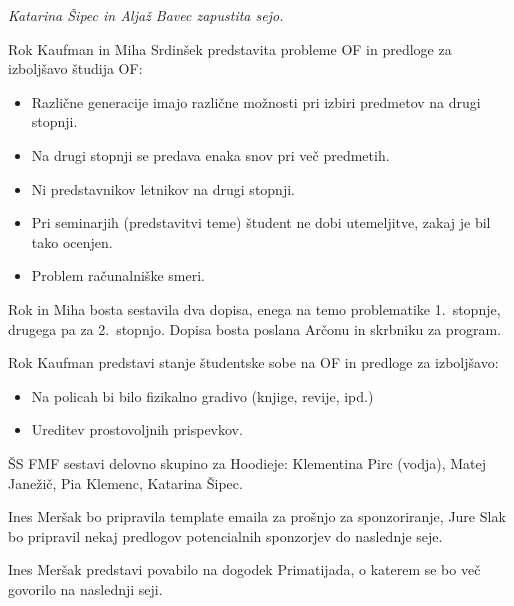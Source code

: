 \documentclass{seja}
\begin{document}
\begin{ad}
    \textit{Katarina Šipec in Aljaž Bavec zapustita sejo.}
    \item
    Rok Kaufman in Miha Srdinšek predstavita probleme OF in predloge za izboljšavo študija OF:
    \begin{itemize}
        \item
        Različne generacije imajo različne možnosti pri izbiri predmetov na drugi stopnji.
        \item
        Na drugi stopnji se predava enaka snov pri več predmetih.
        \item
        Ni predstavnikov letnikov na drugi stopnji.
        \item
        Pri seminarjih (predstavitvi teme) študent ne dobi utemeljitve, zakaj je bil tako ocenjen.
        \item
        Problem računalniške smeri.
    \end{itemize}
    Rok in Miha bosta sestavila dva dopisa, enega na temo problematike 1.~stopnje, drugega pa za 2.~stopnjo. Dopisa bosta poslana Arčonu in skrbniku za program.
    \item
    Rok Kaufman predstavi stanje študentske sobe na OF in predloge za izboljšavo:
    \begin{itemize}
        \item
        Na policah bi bilo fizikalno gradivo (knjige, revije, ipd.)
        \item
        Ureditev prostovoljnih prispevkov.
    \end{itemize}
    \item
    ŠS FMF sestavi delovno skupino za Hoodieje: Klementina Pirc (vodja), Matej Janežič, Pia Klemenc, Katarina Šipec.
    \item
    Ines Meršak bo pripravila template emaila za prošnjo za sponzoriranje, Jure Slak bo pripravil nekaj predlogov potencialnih sponzorjev do naslednje seje.
    \item
    Ines Meršak predstavi povabilo na dogodek Primatijada, o katerem se bo več govorilo na naslednji seji.
\end{ad}

\makeatletter \global\let\@enddocumenthook\@empty \makeatother
{}
\end{document}
